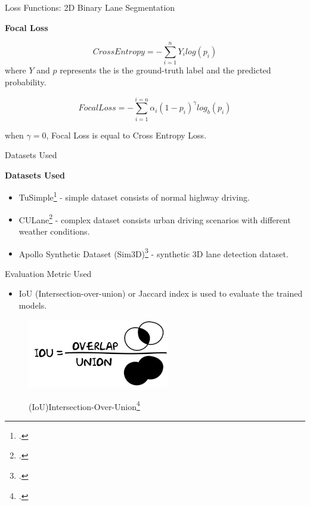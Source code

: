 \documentclass[aspectratio=169]{beamer}
\begin{document}
\begin{frame}{Loss Functions: 2D Binary Lane Segmentation}

\textbf{Focal Loss}

\begin{equation}
            Cross Entropy = - \sum^{n}_{i=1}Y_{i}log(p_{i})
        \end{equation}
        where $Y$ and $p$ represents the is the ground-truth label and the predicted probability.
        
        \begin{equation}
            Focal Loss = - \sum^{i=n}_{i=1} \alpha_{i}(1-p_{i})^{\gamma} log_{b}(p_{i})
        \end{equation}
        
         when $\gamma = 0$, Focal Loss is equal to Cross Entropy Loss.
\end{frame}

\begin{frame}{Datasets Used}

    \textbf{Datasets Used}
    \begin{itemize}
        \item TuSimple\footcite{} - simple dataset consists of normal highway driving.
        \item CULane\footcite{} - complex dataset consists urban driving scenarios with different weather conditions.
        \item Apollo Synthetic Dataset (Sim3D)\footcite{guo2020gen} - synthetic 3D lane detection dataset.
    \end{itemize}
\end{frame}

\begin{frame}{Evaluation Metric Used}
    
    \begin{itemize}
        \item IoU (Intersection-over-union) or Jaccard index is used to evaluate the trained models.
    \end{itemize}
    \begin{figure}[H]
     \centering
     
\includegraphics[width=0.5\linewidth, height=3cm]{images/IOU.png} 
\label{fig:subim1}

\caption{ (IoU)Intersection-Over-Union\footcite{IOU}}
\label{fig:image2}
\end{figure}
\end{frame}
\end{document}
